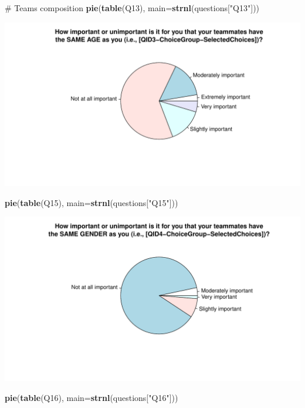 \documentclass[12pt, titlepage]{article}
\newenvironment{Shaded}{\begin{snugshade}}{\end{snugshade}}
\newcommand{\KeywordTok}[1]{\textcolor[rgb]{0.12,0.11,0.11}{\textbf{#1}}}
\newcommand{\DataTypeTok}[1]{\textcolor[rgb]{0.00,0.34,0.68}{#1}}
\newcommand{\StringTok}[1]{\textcolor[rgb]{0.75,0.01,0.01}{#1}}
\newcommand{\CommentTok}[1]{\textcolor[rgb]{0.54,0.53,0.53}{#1}}
\newcommand{\NormalTok}[1]{\textcolor[rgb]{0.12,0.11,0.11}{#1}}
\begin{document}
\begin{Shaded}
\begin{Highlighting}[]
\CommentTok{# Teams composition}
\KeywordTok{pie}\NormalTok{(}\KeywordTok{table}\NormalTok{(Q13), }\DataTypeTok{main=}\KeywordTok{strnl}\NormalTok{(questions[}\StringTok{"Q13"}\NormalTok{]))}
\end{Highlighting}
\end{Shaded}

\includegraphics{report_survey_files/figure-latex/unnamed-chunk-2-10.pdf}

\begin{Shaded}
\begin{Highlighting}[]
\KeywordTok{pie}\NormalTok{(}\KeywordTok{table}\NormalTok{(Q15), }\DataTypeTok{main=}\KeywordTok{strnl}\NormalTok{(questions[}\StringTok{"Q15"}\NormalTok{]))}
\end{Highlighting}
\end{Shaded}

\includegraphics{report_survey_files/figure-latex/unnamed-chunk-2-11.pdf}

\begin{Shaded}
\begin{Highlighting}[]
\KeywordTok{pie}\NormalTok{(}\KeywordTok{table}\NormalTok{(Q16), }\DataTypeTok{main=}\KeywordTok{strnl}\NormalTok{(questions[}\StringTok{"Q16"}\NormalTok{]))}
\end{Highlighting}
\end{Shaded}
\end{document}
